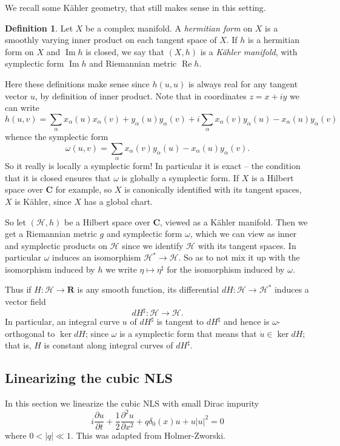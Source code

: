 \documentclass[reqno,12pt,letterpaper]{amsart}
\newcommand{\RR}{\mathbf{R}}
\newcommand{\CC}{\mathbf{C}}
\newcommand{\dfn}[1]{\emph{#1}\index{#1}}
\renewcommand{\Re}{\operatorname{Re}}
\renewcommand{\Im}{\operatorname{Im}}
\theoremstyle{definition}
\newtheorem{definition}[theorem]{Definition}
\begin{document}
We recall some K\"ahler geometry, that still makes sense in this setting.
\begin{definition}
Let $X$ be a complex manifold. A \dfn{hermitian form} on $X$ is a smoothly varying inner product on each tangent space of $X$.
If $h$ is a hermitian form on $X$ and $\Im h$ is closed, we say that $(X, h)$ is a \dfn{K\"ahler manifold}, with symplectic form $\Im h$ and Riemannian metric $\Re h$.
\end{definition}
Here these definitions make sense since $h(u, u)$ is always real for any tangent vector $u$, by definition of inner product.
Note that in coordinates $z = x + iy$ we can write
$$h(u, v) = \sum_\alpha x_\alpha(u) x_\alpha(v) + y_\alpha(u) y_\alpha(v) + i\sum_\alpha x_\alpha(v) y_\alpha(u) - x_\alpha(u) y_\alpha(v)$$
whence the symplectic form
$$\omega(u, v) = \sum_\alpha x_\alpha(v) y_\alpha(u) - x_\alpha(u) y_\alpha(v).$$
So it really is locally a symplectic form!
In particular it is exact -- the condition that it is closed ensures that $\omega$ is globally a symplectic form.
If $X$ is a Hilbert space over $\CC$ for example, so $X$ is canonically identified with its tangent spaces, $X$ is K\"ahler, since $X$ has a global chart.

So let $(\mathcal H, h)$ be a Hilbert space over $\CC$, viewed as a K\"ahler manifold.
Then we get a Riemannian metric $g$ and symplectic form $\omega$, which we can view as inner and symplectic products on $\mathcal H$ since we identify $\mathcal H$ with its tangent spaces. In particular $\omega$ induces an isomorphism $\mathcal H^* \to \mathcal H$.
So as to not mix it up with the isomorphism induced by $h$ we write $\eta \mapsto \eta^\sharp$ for the isomorphism induced by $\omega$.

Thus if $H: \mathcal H \to \RR$ is any smooth function, its differential $dH: \mathcal H \to \mathcal H^*$ induces a vector field
$$dH^\sharp: \mathcal H \to \mathcal H.$$
In particular, an integral curve $u$ of $dH^\sharp$ is tangent to $dH^\sharp$ and hence is $\omega$-orthogonal to $\ker dH$; since $\omega$ is a symplectic form that means that $\dot u \in \ker dH$; that is, $H$ is constant along integral curves of $dH^\sharp$.

\subsection{Linearizing the cubic NLS}
In this section we linearize the cubic NLS with small Dirac impurity
$$i \frac{\partial u}{\partial t} + \frac{1}{2} \frac{\partial^2 u}{\partial x^2} + q\delta_0(x)u + u|u|^2 = 0$$
where $0 < |q| \ll 1$. This was adapted from Holmer-Zworski.
\end{document}
